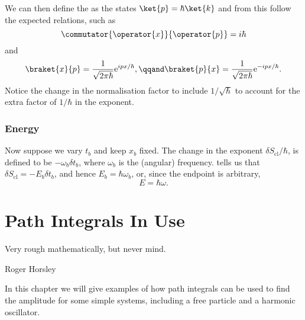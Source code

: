 \documentclass[fleqn]{NotesClass}
\newcommand*{\e}{\mathrm{e}}
\newcommand*{\cl}{\mathrm{cl}}
\begin{document}
    We can then define the  as the states \(\ket{p} = \hbar\ket{k}\) and from this follow the expected relations, such as
    \begin{equation}
        \commutator{\operator{x}}{\operator{p}} = i\hbar
    \end{equation}
    and
    \begin{equation}
        \braket{x}{p} = \frac{1}{\sqrt{2\pi\hbar}} \e^{ipx/\hbar}, \qqand \braket{p}{x} = \frac{1}{\sqrt{2\pi\hbar}} \e^{-ipx/\hbar}.
    \end{equation}
    Notice the change in the normalisation factor to include \(1/\sqrt{\hbar}\) to account for the extra factor of \(1/\hbar\) in the exponent.
    
    \subsection{Energy}
    Now suppose we vary \(t_b\) and keep \(x_b\) fixed.
    The change in the exponent \(\delta S_{\cl}/\hbar\), is defined to be \(-\omega_b\delta t_b\), where \(\omega_b\) is the (angular) frequency.
     tells us that \(\delta S_{\cl} = -E_b\delta t_b\), and hence \(E_b = \hbar\omega_b\), or, since the endpoint is arbitrary,
    \begin{equation}
        E = \hbar\omega.
    \end{equation}
    
    \chapter{Path Integrals In Use}
    \epigraph{Very rough mathematically, but never mind.}{Roger Horsley}
    In this chapter we will give examples of how path integrals can be used to find the amplitude for some simple systems, including a free particle and a harmonic oscillator.
    
\end{document}
